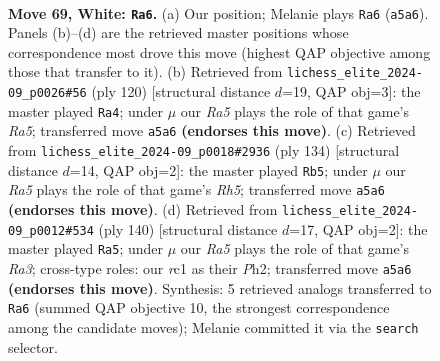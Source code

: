 \documentclass[11pt]{article}
\begin{document}
\clearpage

\begin{figure}[p]\centering
\begin{subfigure}{0.46\textwidth}\centering
\resizebox{\linewidth}{!}{%
\newchessgame
\chessboard[
  setfen={1R6/5p2/4p1k1/R7/P3P3/5PK1/8/2r5 w - - 29 69},
  showmover=false,
  pgfstyle=straightmove, color=movearrow, markmove={a5-a6}
]}
\caption{}
\end{subfigure}\hfill
\begin{subfigure}{0.46\textwidth}\centering
\resizebox{\linewidth}{!}{%
\newchessgame
\chessboard[
  setfen={8/6p1/2r2k1p/R6P/5KP1/8/8/8 w - - 5 61},
  showmover=false,
  pgfstyle=straightmove, color=movearrow, markmove={a5-a4}
]}
\caption{}
\end{subfigure}
\\[4pt]
\begin{subfigure}{0.46\textwidth}\centering
\resizebox{\linewidth}{!}{%
\newchessgame
\chessboard[
  setfen={6k1/6p1/5p2/7R/7P/5PK1/8/r7 w - - 15 68},
  showmover=false,
  pgfstyle=straightmove, color=movearrow, markmove={h5-b5}
]}
\caption{}
\end{subfigure}\hfill
\begin{subfigure}{0.46\textwidth}\centering
\resizebox{\linewidth}{!}{%
\newchessgame
\chessboard[
  setfen={1K6/8/8/4p2p/3k2p1/R5P1/7P/8 w - - 0 71},
  showmover=false,
  pgfstyle=straightmove, color=movearrow, markmove={a3-a5}
]}
\caption{}
\end{subfigure}
\caption{\textbf{Move 69, White: \texttt{Ra6}.} (a) Our position; Melanie plays \texttt{Ra6} (\texttt{a5a6}). Panels (b)--(d) are the retrieved master positions whose correspondence most drove this move (highest QAP objective among those that transfer to it). (b) Retrieved from \texttt{lichess\_elite\_2024-09\_p0026\#56} (ply 120) [structural distance $d$=19, QAP obj=3]: the master played \texttt{Ra4}; under $\mu$ our \emph{Ra5} plays the role of that game's \emph{Ra5}; transferred move \texttt{a5a6} \textbf{(endorses this move)}. (c) Retrieved from \texttt{lichess\_elite\_2024-09\_p0018\#2936} (ply 134) [structural distance $d$=14, QAP obj=2]: the master played \texttt{Rb5}; under $\mu$ our \emph{Ra5} plays the role of that game's \emph{Rh5}; transferred move \texttt{a5a6} \textbf{(endorses this move)}. (d) Retrieved from \texttt{lichess\_elite\_2024-09\_p0012\#534} (ply 140) [structural distance $d$=17, QAP obj=2]: the master played \texttt{Ra5}; under $\mu$ our \emph{Ra5} plays the role of that game's \emph{Ra3}; cross-type roles: our \emph{r}c1 as their \emph{P}h2; transferred move \texttt{a5a6} \textbf{(endorses this move)}. Synthesis: 5 retrieved analogs transferred to \texttt{Ra6} (summed QAP objective 10, the strongest correspondence among the candidate moves); Melanie committed it via the \texttt{search} selector.}
\label{fig:thought-m136}
\end{figure}
\end{document}
